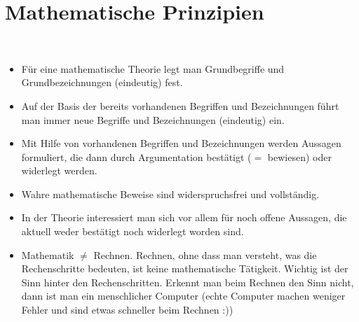 \section{Mathematische Prinzipien} 

\begin{bem}\ 
\begin{itemize}
		\item Für eine mathematische Theorie legt man Grundbegriffe und Grundbezeichnungen (eindeutig) fest. 
		\item Auf der Basis der bereits vorhandenen Begriffen und Bezeichnungen führt man immer neue Begriffe und Bezeichnungen (eindeutig) ein. 
		\item Mit Hilfe von vorhandenen Begriffen und Bezeichnungen werden Aussagen formuliert, die dann durch Argumentation bestätigt ($=$ bewiesen) oder widerlegt werden. 
		\item Wahre mathematische Beweise sind widerspruchsfrei und vollständig. 
		\item In der Theorie interessiert man sich vor allem für noch offene Aussagen, die aktuell weder bestätigt noch widerlegt worden sind. 
		\item Mathematik $\ne$ Rechnen. Rechnen, ohne dass man versteht, was die Rechenschritte bedeuten, ist keine mathematische Tätigkeit. Wichtig ist der Sinn hinter den Rechenschritten. Erkennt man beim Rechnen den Sinn nicht, dann ist man ein menschlicher Computer (echte Computer machen weniger Fehler und sind etwas schneller beim Rechnen :)) 
\end{itemize} 
\end{bem} 


 
 
 

\appendix 

